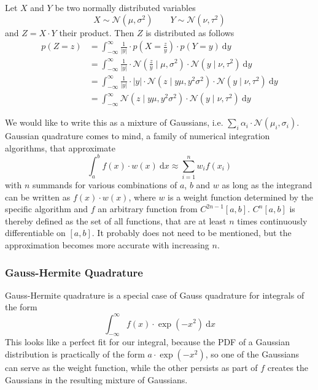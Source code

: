 \documentclass[11pt,a4paper]{book}
\begin{document}
Let $X$ and $Y$ be two normally distributed variables
\begin{equation*}
  X \sim \mathcal{N}(\mu, \sigma^{2}) \qquad Y \sim \mathcal{N}(\nu, \tau^{2})
\end{equation*}
and $Z = X \cdot Y$ their product. Then $Z$ is distributed as follows
\begin{align*}
  p(Z = z) & = \int_{-\infty}^{\infty} \frac{1}{|y|} \cdot p\left(X = \frac{z}{y}\right) \cdot p(Y = y)~\mathrm{d}y\\
           & = \int_{-\infty}^{\infty} \frac{1}{|y|} \cdot \mathcal{N}\left( \frac{z}{y} \mid \mu, \sigma^{2} \right) \cdot \mathcal{N}(y \mid \nu, \tau^{2})~\mathrm{d}y\\
           & = \int_{-\infty}^{\infty} \frac{1}{|y|} \cdot |y| \cdot \mathcal{N}\left( z \mid y\mu, y^{2}\sigma^{2} \right) \cdot \mathcal{N}(y \mid \nu, \tau^{2})~\mathrm{d}y\\
           & = \int_{-\infty}^{\infty} \mathcal{N}\left( z \mid y\mu, y^{2}\sigma^{2} \right) \cdot \mathcal{N}(y \mid \nu, \tau^{2})~\mathrm{d}y
\end{align*}

We would like to write this as a mixture of Gaussians, i.e.
$\sum_{i} \alpha_{i} \cdot \mathcal{N}(\mu_{i}, \sigma_{i})$. Gaussian
quadrature comes to mind, a family of numerical integration algorithms, that
approximate
\begin{equation*}
  \int_{a}^{b} f(x) \cdot w(x)~\mathrm{d}x \approx \sum_{i = 1}^{n} w_{i} f(x_{i})
\end{equation*}
with $n$ summands for various combinations of $a$, $b$ and $w$ as long as the
integrand can be written as $f(x) \cdot w(x)$, where $w$ is a weight function
determined by the specific algorithm and $f$ an arbitrary function from
$C^{2n - 1}[a, b]$. $C^{n}[a, b]$ is thereby defined as the set of all
functions, that are at least $n$ times continuously differentiable on $[a, b]$.
It probably does not need to be mentioned, but the approximation becomes more
accurate with increasing $n$.

\subsubsection{Gauss-Hermite Quadrature}

Gauss-Hermite quadrature is a special case of Gauss quadrature for integrals of
the form
\begin{equation*}
  \int_{-\infty}^{\infty} f(x) \cdot \exp(-x^{2})~\mathrm{d}x
\end{equation*}
This looks like a perfect fit for our integral, because the PDF of a Gaussian
distribution is practically of the form $a \cdot \exp(-x^{2})$, so one of the
Gaussians can serve as the weight function, while the other persists as part of
$f$ creates the Gaussians in the resulting mixture of Gaussians.
\end{document}
